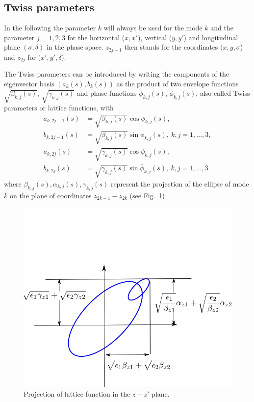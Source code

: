 \documentclass[english]{article}
\begin{document}
\subsection{Twiss parameters}
\label{opt:sec:4}
In the following the parameter $k$ will always be used for the mode $k$ and the parameter $j=1,2,3$ for the horizontal ($x,x'$), vertical ($y,y'$) and longitudinal plane $(\sigma,\delta)$ in the phase space. $z_{2j-1}$ then stands for the coordinates $(x,y,\sigma$) and $z_{2j}$ for $(x',y',\delta$).

The Twiss parameters can be introduced by writing the components of the eigenvector basis $(a_k(s),b_k(s))$ as the product of two envelope functions $\sqrt{\beta_{k,j}(s)}$, $\sqrt{\gamma_{k,j}(s)}$ and phase functions $\phi_{k,j}(s)$, $\bar\phi_{k,j}(s)$, also called Twiss parameters or lattice functions, with
\begin{align}
a_{k,2j-1}(s)&=\sqrt{\beta_{k,j}(s)}\cos{\phi_{k,j}(s)},\nonumber\\ b_{k,2j-1}(s)&=\sqrt{\beta_{k,j}(s)}\sin{\phi_{k,j}(s)}, \ k,j=1,\ldots,3, \label{opt:eqn:4:1}\\
a_{k,2j}(s)&=\sqrt{\gamma_{k,j}(s)}\cos{\bar\phi_{k,j}(s)}, \nonumber\\
b_{k,2j}(s)&=\sqrt{\gamma_{k,j}(s)}\sin{\bar\phi_{k,j}(s)}, \ k,j=1,\ldots,3 \label{opt:eqn:4:2}
\end{align}
where $\beta_{k,j}(s), \alpha_{k,j}(s), \gamma_{k,j}(s)$ represent the projection of the ellipse of mode $k$ on the plane of coordinates $z_{2k-1}-z_{2k}$ (see Fig.~\ref{opt:fig:2})
\begin{figure}[!ht]
	\centering
	\includegraphics[width=1.0\linewidth]{ripken_phase_space_ellipse.png}
	\caption{Projection of lattice function in the $z-z'$ plane.\label{opt:fig:2}}
\end{figure}
\end{document}
